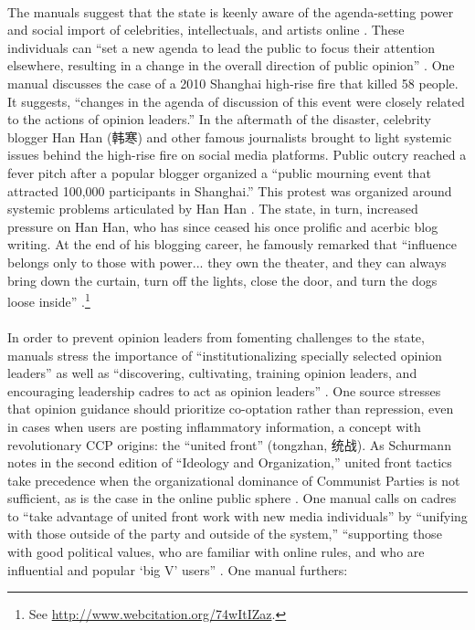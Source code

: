 \documentclass[12pt]{article}
\begin{document}
\begin{CJK*}{UTF8}{gbsn}
\paragraph{} The manuals suggest that the state is keenly aware of the agenda-setting power and social import of celebrities, intellectuals, and artists online \citep[115-123]{dang2013wangluo}. These individuals can ``set a new agenda to lead the public to focus their attention elsewhere, resulting in a change in the overall direction of public opinion'' \citep[201-228]{zhou2011weibo}. One manual discusses the case of a 2010 Shanghai high-rise fire that killed 58 people. It suggests, ``changes in the agenda of discussion of this event were closely related to the actions of opinion leaders.'' In the aftermath of the disaster, celebrity blogger Han Han (韩寒) and other famous journalists brought to light systemic issues behind the high-rise fire on social media platforms. Public outcry reached a fever pitch after a popular blogger organized a ``public mourning event that attracted 100,000 participants in Shanghai.'' This protest was organized around systemic problems articulated by Han Han \citep[201-228]{zhou2011weibo}. The state, in turn, increased pressure on Han Han, who has since ceased his once prolific and acerbic blog writing. At the end of his blogging career, he famously remarked that ``influence belongs only to those with power... they own the theater, and they can always bring down the curtain, turn off the lights, close the door, and turn the dogs loose inside'' \citep{osnos2014age}.\footnote{See \href{http://www.webcitation.org/74wItIZaz}{http://www.webcitation.org/74wItIZaz}.}

\paragraph{} In order to prevent opinion leaders from fomenting challenges to the state, manuals stress the importance of ``institutionalizing specially selected opinion leaders'' as well as ``discovering, cultivating, training opinion leaders, and encouraging leadership cadres to act as opinion leaders'' \citep[201-228]{zhou2011weibo}. One source stresses that opinion guidance should prioritize co-optation rather than repression, even in cases when users are posting inflammatory information, a concept with revolutionary CCP origins: the ``united front'' (tongzhan, 统战). As Schurmann notes in the second edition of ``Ideology and Organization,'' united front tactics take precedence when the organizational dominance of Communist Parties is not sufficient, as is the case in the online public sphere \citep[528]{schurmann1968ideology}. One manual calls on cadres to ``take advantage of united front work with new media individuals'' by ``unifying with those outside of the party and outside of the system,'' ``supporting those with good political values,  who are familiar with online rules, and who are influential and popular `big V' users'' \citep{zhou2012buduan}. One manual furthers:


\end{CJK*}
\end{document}
